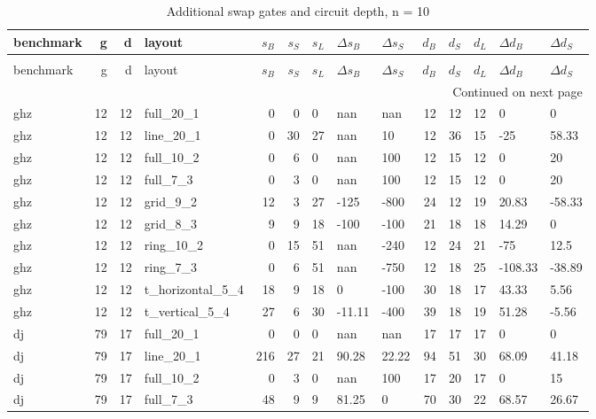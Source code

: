 \begin{longtable}{lrrlrrlllrrlll}
\caption{Additional swap gates and circuit depth, n = 10} \label{benchmark-table-10} \\
\toprule
benchmark & g & d & layout & $s_B$ & $s_S$ & $s_L$ & $\Delta s_B$ & $\Delta s_S$ & $d_B$ & $d_S$ & $d_L$ & $\Delta d_B$ & $\Delta d_S$ \\
\midrule
\endfirsthead
\caption[]{Additional swap gates and circuit depth, n = 10} \\
\toprule
benchmark & g & d & layout & $s_B$ & $s_S$ & $s_L$ & $\Delta s_B$ & $\Delta s_S$ & $d_B$ & $d_S$ & $d_L$ & $\Delta d_B$ & $\Delta d_S$ \\
\midrule
\endhead
\midrule
\multicolumn{14}{r}{Continued on next page} \\
\midrule
\endfoot
\bottomrule
\endlastfoot
ghz & 12 & 12 & full\_20\_1 & 0 & 0 & 0 & nan & nan & 12 & 12 & 12 & 0 & 0 \\
ghz & 12 & 12 & line\_20\_1 & 0 & 30 & 27 & nan & 10 & 12 & 36 & 15 & -25 & 58.33 \\
ghz & 12 & 12 & full\_10\_2 & 0 & 6 & 0 & nan & 100 & 12 & 15 & 12 & 0 & 20 \\
ghz & 12 & 12 & full\_7\_3 & 0 & 3 & 0 & nan & 100 & 12 & 15 & 12 & 0 & 20 \\
ghz & 12 & 12 & grid\_9\_2 & 12 & 3 & 27 & -125 & -800 & 24 & 12 & 19 & 20.83 & -58.33 \\
ghz & 12 & 12 & grid\_8\_3 & 9 & 9 & 18 & -100 & -100 & 21 & 18 & 18 & 14.29 & 0 \\
ghz & 12 & 12 & ring\_10\_2 & 0 & 15 & 51 & nan & -240 & 12 & 24 & 21 & -75 & 12.5 \\
ghz & 12 & 12 & ring\_7\_3 & 0 & 6 & 51 & nan & -750 & 12 & 18 & 25 & -108.33 & -38.89 \\
ghz & 12 & 12 & t\_horizontal\_5\_4 & 18 & 9 & 18 & 0 & -100 & 30 & 18 & 17 & 43.33 & 5.56 \\
ghz & 12 & 12 & t\_vertical\_5\_4 & 27 & 6 & 30 & -11.11 & -400 & 39 & 18 & 19 & 51.28 & -5.56 \\
dj & 79 & 17 & full\_20\_1 & 0 & 0 & 0 & nan & nan & 17 & 17 & 17 & 0 & 0 \\
dj & 79 & 17 & line\_20\_1 & 216 & 27 & 21 & 90.28 & 22.22 & 94 & 51 & 30 & 68.09 & 41.18 \\
dj & 79 & 17 & full\_10\_2 & 0 & 3 & 0 & nan & 100 & 17 & 20 & 17 & 0 & 15 \\
dj & 79 & 17 & full\_7\_3 & 48 & 9 & 9 & 81.25 & 0 & 70 & 30 & 22 & 68.57 & 26.67 \\

\end{longtable}
